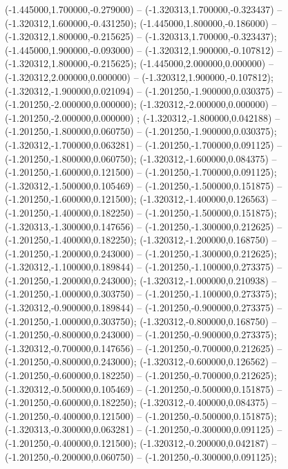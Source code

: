  (-1.445000,1.700000,-0.279000) -- (-1.320313,1.700000,-0.323437) -- (-1.320312,1.600000,-0.431250);
 (-1.445000,1.800000,-0.186000) -- (-1.320312,1.800000,-0.215625) -- (-1.320313,1.700000,-0.323437);
 (-1.445000,1.900000,-0.093000) -- (-1.320312,1.900000,-0.107812) -- (-1.320312,1.800000,-0.215625);
 (-1.445000,2.000000,0.000000) -- (-1.320312,2.000000,0.000000) -- (-1.320312,1.900000,-0.107812);
 (-1.320312,-1.900000,0.021094) -- (-1.201250,-1.900000,0.030375) -- (-1.201250,-2.000000,0.000000);
 (-1.320312,-2.000000,0.000000) -- (-1.201250,-2.000000,0.000000) ;
 (-1.320312,-1.800000,0.042188) -- (-1.201250,-1.800000,0.060750) -- (-1.201250,-1.900000,0.030375);
 (-1.320312,-1.700000,0.063281) -- (-1.201250,-1.700000,0.091125) -- (-1.201250,-1.800000,0.060750);
 (-1.320312,-1.600000,0.084375) -- (-1.201250,-1.600000,0.121500) -- (-1.201250,-1.700000,0.091125);
 (-1.320312,-1.500000,0.105469) -- (-1.201250,-1.500000,0.151875) -- (-1.201250,-1.600000,0.121500);
 (-1.320312,-1.400000,0.126563) -- (-1.201250,-1.400000,0.182250) -- (-1.201250,-1.500000,0.151875);
 (-1.320313,-1.300000,0.147656) -- (-1.201250,-1.300000,0.212625) -- (-1.201250,-1.400000,0.182250);
 (-1.320312,-1.200000,0.168750) -- (-1.201250,-1.200000,0.243000) -- (-1.201250,-1.300000,0.212625);
 (-1.320312,-1.100000,0.189844) -- (-1.201250,-1.100000,0.273375) -- (-1.201250,-1.200000,0.243000);
 (-1.320312,-1.000000,0.210938) -- (-1.201250,-1.000000,0.303750) -- (-1.201250,-1.100000,0.273375);
 (-1.320312,-0.900000,0.189844) -- (-1.201250,-0.900000,0.273375) -- (-1.201250,-1.000000,0.303750);
 (-1.320312,-0.800000,0.168750) -- (-1.201250,-0.800000,0.243000) -- (-1.201250,-0.900000,0.273375);
 (-1.320312,-0.700000,0.147656) -- (-1.201250,-0.700000,0.212625) -- (-1.201250,-0.800000,0.243000);
 (-1.320312,-0.600000,0.126562) -- (-1.201250,-0.600000,0.182250) -- (-1.201250,-0.700000,0.212625);
 (-1.320312,-0.500000,0.105469) -- (-1.201250,-0.500000,0.151875) -- (-1.201250,-0.600000,0.182250);
 (-1.320312,-0.400000,0.084375) -- (-1.201250,-0.400000,0.121500) -- (-1.201250,-0.500000,0.151875);
 (-1.320313,-0.300000,0.063281) -- (-1.201250,-0.300000,0.091125) -- (-1.201250,-0.400000,0.121500);
 (-1.320312,-0.200000,0.042187) -- (-1.201250,-0.200000,0.060750) -- (-1.201250,-0.300000,0.091125);
